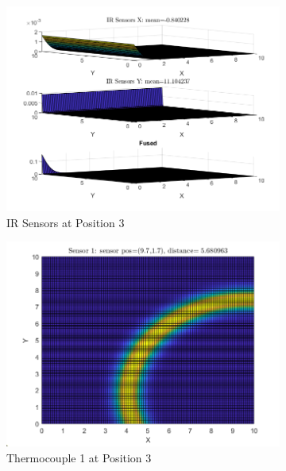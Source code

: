 \documentclass[12pt]{article}
\begin{document}
\begin{figure}[H]
    \centering
    \begin{subfigure}[h]{0.8\textwidth}
        \includegraphics[width=\textwidth]{images/P3.png}
        \caption{IR Sensors at Position 3}
        \label{fig:P3IR}
    \end{subfigure}
    \baselineskip
    \begin{subfigure}[h]{0.4\textwidth}
        \includegraphics[width=\textwidth]{images/P3S1.png}
        \caption{Thermocouple 1 at Position 3}
        \label{fig:P3S1}
    \end{subfigure}
    \begin{subfigure}[h]{0.4\textwidth}

\end{subfigure}
\end{figure}
\end{document}
